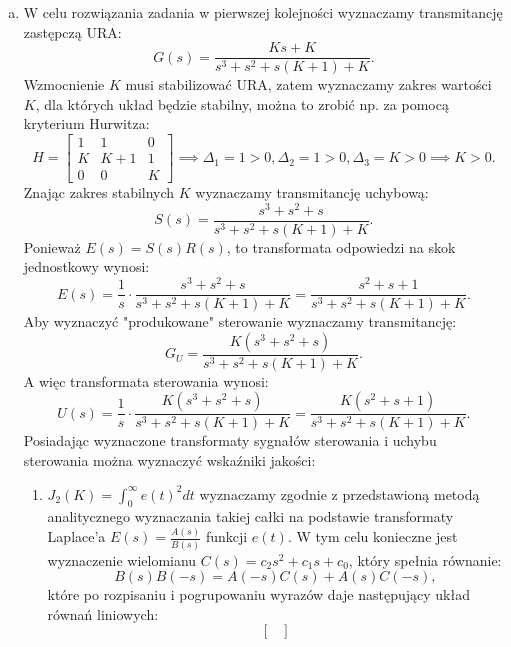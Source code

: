 \documentclass{article}
\begin{document}
    \begin{enumerate}[(a)]
        \item W celu rozwiązania zadania w pierwszej kolejności wyznaczamy transmitancję zastępczą URA:
        $$
            G(s) = \frac{Ks + K}{s^{3} + s^{2} + s(K+1) + K}.
        $$
        Wzmocnienie $K$ musi stabilizować URA, zatem wyznaczamy zakres wartości $K$, dla których układ będzie stabilny, można to zrobić np. za pomocą kryterium Hurwitza:
        $$
            H
            =
            \begin{bmatrix}
                1 & 1 & 0\\
                K & K+1 & 1\\
                0 & 0 & K
            \end{bmatrix}
            \implies
            \Delta_{1} = 1 > 0,
            \Delta_{2} = 1 > 0,
            \Delta_{3} = K > 0
            \implies K > 0.
        $$
        Znając zakres stabilnych $K$ wyznaczamy transmitancję uchybową:
        $$
            S(s) = \frac{s^3 + s^2 + s}{s^{3} + s^{2} + s(K+1) + K}.
        $$
        Ponieważ $E(s) = S(s)R(s)$, to transformata odpowiedzi na skok jednostkowy wynosi:
        $$
            E(s) = \frac{1}{s} \cdot \frac{s^3 + s^2 + s}{s^{3} + s^{2} + s(K+1) + K} = \frac{s^2 + s + 1}{s^{3} + s^{2} + s(K+1) + K}.
        $$
        Aby wyznaczyć "produkowane" sterowanie wyznaczamy transmitancję:
        $$
            G_{U} = \frac{K(s^3 + s^2 + s)}{s^{3} + s^{2} + s(K+1) + K}.
        $$
        A więc transformata sterowania wynosi:
        $$
            U(s) = \frac{1}{s} \cdot \frac{K(s^3 + s^2 + s)}{s^{3} + s^{2} + s(K+1) + K} = \frac{K(s^2 + s + 1)}{s^{3} + s^{2} + s(K+1) + K}.
        $$
        Posiadając wyznaczone transformaty sygnałów sterowania i uchybu sterowania można wyznaczyć wskaźniki jakości:
        \begin{enumerate}[label=(\arabic*.)]
            \item $J_{2}(K) = \int_{0}^{\infty}{e(t)^2dt}$ wyznaczamy zgodnie z przedstawioną metodą analitycznego wyznaczania takiej całki na podstawie transformaty Laplace'a $E(s) = \frac{A(s)}{B(s)}$ funkcji $e(t)$.
            W tym celu konieczne jest wyznaczenie wielomianu $C(s) = c_{2}s^2 + c_{1}s + c_{0}$, który spełnia równanie:
            $$
                B(s)B(-s) = A(-s)C(s) + A(s)C(-s),
            $$
            które po rozpisaniu i pogrupowaniu wyrazów daje następujący układ równań liniowych:
            $$
                \begin{bmatrix}

\end{bmatrix}$$
\end{enumerate}
\end{enumerate}
\end{document}
